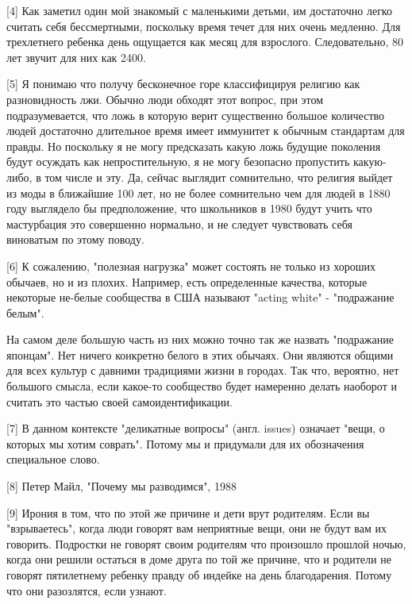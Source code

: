 \documentclass[ebook,12pt,oneside,openany]{memoir}
\begin{document}
[4] Как заметил один мой знакомый с маленькими детьми, им достаточно
легко считать себя бессмертными, поскольку время течет для них очень
медленно. Для трехлетнего ребенка день ощущается как месяц для
взрослого. Следовательно, 80 лет звучит для них как 2400.

[5] Я понимаю что получу бесконечное горе классифицируя религию как
разновидность лжи. Обычно люди обходят этот вопрос, при этом
подразумевается, что ложь в которую верит существенно большое
количество людей достаточно длительное время имеет иммунитет к обычным
стандартам для правды. Но поскольку я не могу предсказать какую ложь
будущие поколения будут осуждать как непростительную, я не могу
безопасно пропустить какую-либо, в том числе и эту. Да, сейчас
выглядит сомнительно, что религия выйдет из моды в ближайшие 100 лет,
но не более сомнительно чем для людей в 1880 году выглядело бы
предположение, что школьников в 1980 будут учить что мастурбация это
совершенно нормально, и не следует чувствовать себя виноватым по этому
поводу.

[6] К сожалению, "полезная нагрузка" может состоять не только из
хороших обычаев, но и из плохих. Например, есть определенные качества,
которые некоторые не-белые сообщества в США называют "acting white" -
"подражание белым".

На самом деле большую часть из них можно точно так же назвать
"подражание японцам". Нет ничего конкретно белого в этих обычаях. Они
являются общими для всех культур с давними традициями жизни в городах.
Так что, вероятно, нет большого смысла, если какое-то сообщество будет
намеренно делать наоборот и считать это частью своей
самоидентификации.

[7] В данном контексте "деликатные вопросы" (англ. issues) означает
"вещи, о которых мы хотим соврать". Потому мы и придумали для их
обозначения специальное слово.

[8] Петер Майл, "Почему мы разводимся", 1988

[9] Ирония в том, что по этой же причине и дети врут родителям. Если
вы "взрываетесь", когда люди говорят вам неприятные вещи, они не будут
вам их говорить. Подростки не говорят своим родителям что произошло
прошлой ночью, когда они решили остаться в доме друга по той же
причине, что и родители не говорят пятилетнему ребенку правду об
индейке на день благодарения. Потому что они разозлятся, если узнают.
\end{document}

